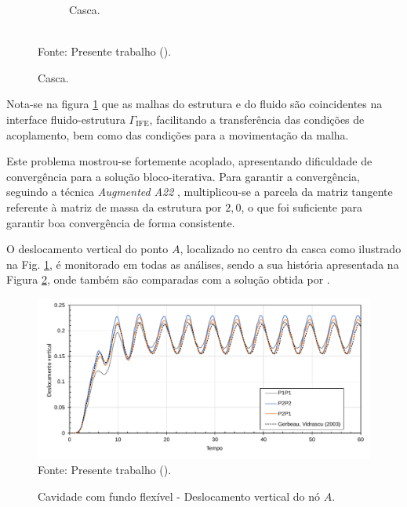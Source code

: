 \begin{figure}[h!]
\begin{subfigure}[b]{0.32\textwidth}
        \caption{Casca.}
    \end{subfigure}
    \\Fonte: Presente trabalho (\the\year).
    \label{fig:Cavity2D-mesh}
\end{figure}

Nota-se na figura \ref{fig:Cavity2D-mesh} que as malhas do estrutura e do fluido são coincidentes na interface fluido-estrutura $\Gamma_\mathrm{IFE}$, facilitando a transferência das condições de acoplamento, bem como das condições para a movimentação da malha.

Este problema mostrou-se fortemente acoplado, apresentando dificuldade de convergência para a solução bloco-iterativa. Para garantir a convergência, seguindo a técnica \textit{Augmented A22} \cite{tezduyar2005finite}, multiplicou-se a parcela da matriz tangente referente à matriz de massa da estrutura por $2,0$, o que foi suficiente para garantir boa convergência de forma consistente.

O deslocamento vertical do ponto $A$, localizado no centro da casca como ilustrado na Fig. \ref{fig:Cavity2D-mesh}, é monitorado em todas as análises, sendo a sua história apresentada na Figura \ref{fig:cavity2D-res}, onde também são comparadas com a solução obtida por .

\begin{figure}[h!]
    \centering
    \caption{Cavidade com fundo flexível - Deslocamento vertical do nó $A$.}
    \includegraphics[width=\linewidth]{Figuras/FSI-Cavity2D/resultados.pdf}
    \\Fonte: Presente trabalho (\the\year).
    \label{fig:cavity2D-res}
\end{figure}


